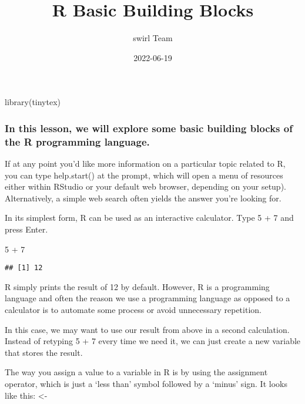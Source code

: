 \documentclass[
]{article}
\title{R Basic Building Blocks}
\author{swirl Team}
\date{2022-06-19}
\newenvironment{Shaded}{\begin{snugshade}}{\end{snugshade}}
\newcommand{\DecValTok}[1]{\textcolor[rgb]{0.00,0.00,0.81}{#1}}
\newcommand{\FunctionTok}[1]{\textcolor[rgb]{0.00,0.00,0.00}{#1}}
\newcommand{\NormalTok}[1]{#1}
\newcommand{\SpecialCharTok}[1]{\textcolor[rgb]{0.00,0.00,0.00}{#1}}
\begin{document}
\maketitle

\begin{Shaded}
\begin{Highlighting}[]
\FunctionTok{library}\NormalTok{(tinytex)}
\end{Highlighting}
\end{Shaded}

\hypertarget{in-this-lesson-we-will-explore-some-basic-building-blocks-of-the-r-programming-language.}{%
\subsubsection{In this lesson, we will explore some basic building
blocks of the R programming
language.}\label{in-this-lesson-we-will-explore-some-basic-building-blocks-of-the-r-programming-language.}}

If at any point you'd like more information on a particular topic
related to R, you can type help.start() at the prompt, which will open a
menu of resources either within RStudio or your default web browser,
depending on your setup). Alternatively, a simple web search often
yields the answer you're looking for.

In its simplest form, R can be used as an interactive calculator. Type 5
+ 7 and press Enter.

\begin{Shaded}
\begin{Highlighting}[]
\DecValTok{5} \SpecialCharTok{+} \DecValTok{7}
\end{Highlighting}
\end{Shaded}

\begin{verbatim}
## [1] 12
\end{verbatim}

R simply prints the result of 12 by default. However, R is a programming
language and often the reason we use a programming language as opposed
to a calculator is to automate some process or avoid unnecessary
repetition.

In this case, we may want to use our result from above in a second
calculation. Instead of retyping 5 + 7 every time we need it, we can
just create a new variable that stores the result.

The way you assign a value to a variable in R is by using the assignment
operator, which is just a `less than' symbol followed by a `minus' sign.
It looks like this: \textless-
\end{document}
